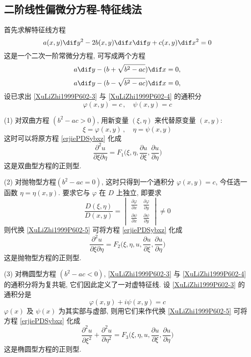 \documentclass[color=green,titlestyle=hang]{elegantbook}%
\begin{document}
\subsection{二阶线性偏微分方程-特征线法}
首先求解特征线方程
\begin{equation}\label{tezhenxianequation}
a(x,y)\dif y^2-2b(x,y)\dif x\dif y+c(x,y)\dif x^2=0
\end{equation}
这是一个二次一阶常微分方程, 可写成两个方程
\begin{equation}\label{XuLiZhi1999P602-3}
a\dif y-(b+\sqrt{b^2-ac})\dif x=0,
\end{equation}
\begin{equation}\label{XuLiZhi1999P602-4}
a\dif y-(b-\sqrt{b^2-ac})\dif x=0,
\end{equation}
设已求出 \eqref{XuLiZhi1999P602-3} 与 \eqref{XuLiZhi1999P602-4} 的通积分
\[\varphi(x,y)=c\,,\quad \psi(x,y)=c\]
\par(1) 对双曲方程 $(b^2-ac>0)$,%
用新变量 $(\xi,\eta)$ 来代替原变量 $(x,y)$:
\begin{equation}\label{XuLiZhi1999P602-5}
\xi=\varphi(x,y)\,,\quad \eta=\psi(x,y)
\end{equation}
这时可以将原方程 \eqref{erjiePDSybxz} 化成
\[\frac{\partial^2u}{\partial\xi\partial\eta}=F_1\Big(\xi,\eta,\frac{\partial u}{\partial\xi},\frac{\partial u}{\partial\eta}\Big)\]
这是双曲型方程的正则型.
\par(2) 对抛物型方程$(b^2-ac=0)$,%
这时只得到一个通积分 $\varphi(x,y)=c$, 今任选一函数 $\eta=\eta(x,y)$. 要求它与 $\varphi$ 在 $D$ 上独立, 即要求
\[\frac{D(\xi,\eta)}{D(x,y)}=\begin{vmatrix}
\frac{\partial\varphi}{\partial x} & \frac{\partial\varphi}{\partial y}\\[3mm]
\frac{\partial\psi}{\partial x} & \frac{\partial\psi}{\partial y}
\end{vmatrix}\neq0\]
则代换 \eqref{XuLiZhi1999P602-5} 可将方程 \eqref{erjiePDSybxz} 化成
\[\frac{\partial^2u}{\partial\xi\partial\eta}=F_2\Big(\xi,\eta,u,\frac{\partial u}{\partial\xi},\frac{\partial u}{\partial\eta}\Big)\]
这是抛物型方程的正则型.
\par(3) 对椭圆型方程 $(b^2-ac<0)$, \eqref{XuLiZhi1999P602-3} 与 \eqref{XuLiZhi1999P602-4} 的通积分将为复共轭, 它们因此定义了一对虚特征线. 设 \eqref{XuLiZhi1999P602-3} 的通积分是
\[\varphi(x,y)+i\psi(x,y)=c\]
$\varphi(x)$ 及 $\psi(x)$ 为其实部与虚部, 则用它们来作代换 \eqref{XuLiZhi1999P602-5} 可将方程 \eqref{erjiePDSybxz} 化成
\[\frac{\partial^2u}{\partial\xi^2}+\frac{\partial^2u}{\partial\eta^2}=F_3\Big(\xi,\eta,u,\frac{\partial u}{\partial\xi},\frac{\partial u}{\partial\eta}\Big)\]
这是椭圆型方程的正则型.
\end{document}
